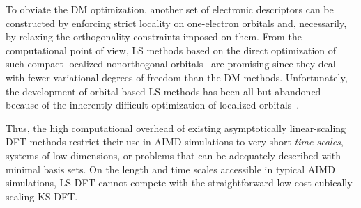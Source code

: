 \documentclass[aps,prl,reprint,amsmath,amssymb]{revtex4-1}
\begin{document}
To obviate the DM optimization, another set of electronic descriptors can be constructed by enforcing strict locality on one-electron orbitals and, necessarily, by relaxing the orthogonality constraints imposed on them. 
From the computational point of view, LS methods based on the direct optimization of such compact localized nonorthogonal orbitals~\cite{a:ls-galli-parrinello-1992,a:ls-mauri-galli-car-1993,a:ls-ordejon-1993,a:ls-mauri-galli-1994,a:ls-ordejon-1995,a:ls-kim-mauri-galli-1995,a:ls-fattebert-2004,a:ls-fattebert-2006,a:burger-yang-2008} are promising since they deal with fewer variational degrees of freedom than the DM methods. 
Unfortunately, the development of orbital-based LS methods has been all but abandoned because of the inherently difficult optimization of localized orbitals~\cite{a:ls-mauri-galli-car-1993,a:ls-ordejon-1995,a:ls-fattebert-2004,a:ls-rev-1999,a:weitao-yang-2013}. 


Thus, the high computational overhead of existing asymptotically linear-scaling DFT methods restrict their use in AIMD simulations to very short \emph{time scales}, systems of low dimensions, or problems that can be adequately described with minimal basis sets. 
On the length and time scales accessible in typical AIMD simulations, LS DFT cannot compete with the straightforward low-cost cubically-scaling KS DFT.
\end{document}
